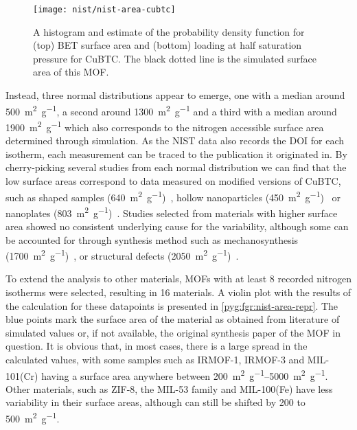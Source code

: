 \begin{wrapfigure}{h}{0.5\textwidth}
	\centering
	\texttt{[image: nist/nist-area-cubtc]}%
	\caption{A histogram and estimate of the probability density
		function for (top) BET surface area and (bottom) loading
		at half saturation pressure for CuBTC. The black dotted line
		is the simulated surface area of this MOF.}%
	\label{pyg:fgr:nist-area-cubtc}
\end{wrapfigure}

Instead, three normal distributions appear to emerge, one with a
median around \SI{500}{\metre^2\per\gram}, a second around \SI{1300}{\metre^2\per\gram}
and a third with a median around \SI{1900}{\metre^2\per\gram} which also
corresponds to the nitrogen accessible surface area determined through
simulation. As the NIST data also records the DOI for each isotherm, each
measurement can be traced to the publication it originated in.
By cherry-picking several studies from each normal distribution
we can find that the low surface areas correspond to data
measured on modified versions of CuBTC, such as shaped
samples (\SI{640}{\metre^2\per\gram})~\cite{liSeparationCO2CH42014}, hollow
nanoparticles (\SI{450}{\metre^2\per\gram})~\cite{liControllableSynthesisMetal2013}
or nanoplates
(\SI{803}{\metre^2\per\gram})~\cite{pengSurfactantdirectedAssemblyMesoporous2012}.
Studies selected from materials with higher surface area
showed no consistent underlying cause for the variability,
although some can be accounted for through synthesis method
such as mechanosynthesis
(\SI{1700}{\metre^2\per\gram})~\cite{klimakowMechanochemicalSynthesisMetal2010},
or structural defects (\SI{2050}{\metre^2\per\gram})~\cite{barinDefectCreationLinker2014}.

To extend the analysis to other materials, MOFs with
at least 8 recorded nitrogen isotherms were selected, resulting in
16 materials. A violin plot with the results of the calculation for
these datapoints is presented in \autoref{pyg:fgr:nist-area-repr}.
The blue points mark the surface area of the material as
obtained from literature of simulated values or, if not available,
the original synthesis paper of the MOF in question.
It is obvious that, in most cases, there is a large spread in
the calculated values, with some samples such as IRMOF-1,
IRMOF-3 and MIL-101(Cr) having a surface area anywhere
between \SIrange{200}{5000}{\metre^2\per\gram}. Other materials,
such as ZIF-8, the MIL-53 family
and MIL-100(Fe) have less variability in their surface areas,
although can still be shifted by 200 to \SI{500}{\metre^2\per\gram}.

